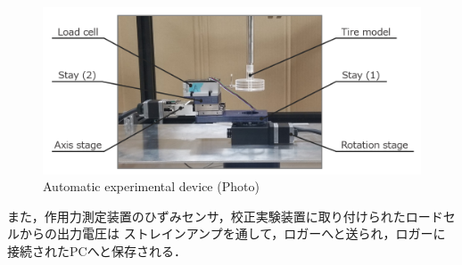 \begin{figure}[htbp]
    \footnotesize
    \begin{center}
        \includegraphics[width=120mm]{images/21-2.png}
        \caption{Automatic experimental device (Photo)}
    \end{center}
\end{figure}

また，作用力測定装置のひずみセンサ，校正実験装置に取り付けられたロードセルからの出力電圧は
ストレインアンプを通して，ロガーへと送られ，ロガーに接続されたPCへと保存される．
